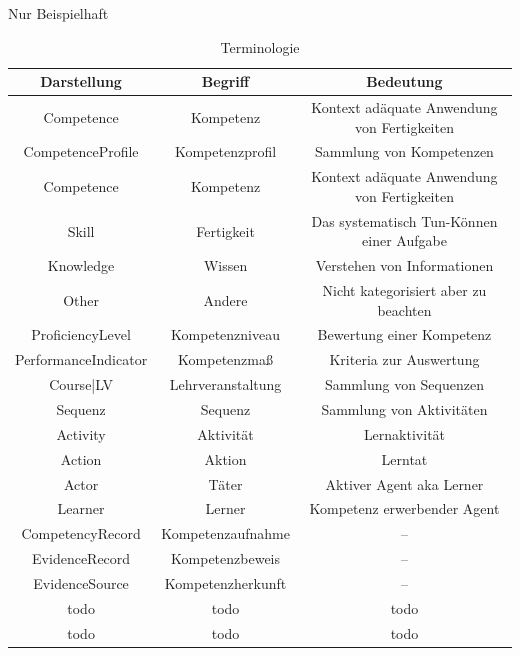 \documentclass[
12pt,
english,
ngerman,
headsepline,
twoside,
openright,
numbers=noenddot,version=first
]{scrreprt}
\providecommand{\tabularnewline}{\\}
\begin{document}
Nur Beispielhaft
\begin{table}[H]
	\caption{Terminologie}
	
	
	\noindent \centering{}\begin{tabular}{ccc}
		\hline 
		\noalign{\vskip\doublerulesep}
		Darstellung & Begriff & Bedeutung\tabularnewline[\doublerulesep]
		\hline
		\noalign{\vskip\doublerulesep}
		Competence & Kompetenz & Kontext adäquate Anwendung von Fertigkeiten \tabularnewline[\doublerulesep]
		\noalign{\vskip\doublerulesep}
		CompetenceProfile & Kompetenzprofil & Sammlung von Kompetenzen \tabularnewline[\doublerulesep]
		\noalign{\vskip\doublerulesep}
		Competence & Kompetenz & Kontext adäquate Anwendung von Fertigkeiten \tabularnewline[\doublerulesep]
		\noalign{\vskip\doublerulesep}
		Skill & Fertigkeit & Das systematisch Tun-Können einer Aufgabe \tabularnewline[\doublerulesep]
		\noalign{\vskip\doublerulesep}
		Knowledge & Wissen & Verstehen von Informationen
		\tabularnewline[\doublerulesep]
		\noalign{\vskip\doublerulesep}
		Other & Andere & Nicht kategorisiert aber zu beachten
		\tabularnewline[\doublerulesep]
		\noalign{\vskip\doublerulesep}
		ProficiencyLevel & Kompetenzniveau & Bewertung einer Kompetenz
		\tabularnewline[\doublerulesep]
		\noalign{\vskip\doublerulesep}
		PerformanceIndicator & Kompetenzmaß & Kriteria zur Auswertung
		\tabularnewline[\doublerulesep]
		\noalign{\vskip\doublerulesep}
		Course|LV & Lehrveranstaltung & Sammlung von Sequenzen
		\tabularnewline[\doublerulesep]
		\noalign{\vskip\doublerulesep}
		Sequenz & Sequenz & Sammlung von Aktivitäten
		\tabularnewline[\doublerulesep]
		\noalign{\vskip\doublerulesep}
		Activity & Aktivität & Lernaktivität
		\tabularnewline[\doublerulesep]
		\noalign{\vskip\doublerulesep}
		Action & Aktion & Lerntat
		\tabularnewline[\doublerulesep]
		\noalign{\vskip\doublerulesep}
		Actor & Täter & Aktiver Agent aka Lerner
		\tabularnewline[\doublerulesep]
		\noalign{\vskip\doublerulesep}
		Learner & Lerner & Kompetenz erwerbender Agent
		\tabularnewline[\doublerulesep]
		\noalign{\vskip\doublerulesep}
		CompetencyRecord & Kompetenzaufnahme & --
		\tabularnewline[\doublerulesep]
		\noalign{\vskip\doublerulesep}
		EvidenceRecord & Kompetenzbeweis & --
		\tabularnewline[\doublerulesep]
		\noalign{\vskip\doublerulesep}
		EvidenceSource & Kompetenzherkunft & --
		\tabularnewline[\doublerulesep]
		\noalign{\vskip\doublerulesep}
		todo & todo & todo
		\tabularnewline[\doublerulesep]
		\noalign{\vskip\doublerulesep}
		todo & todo & todo
		\tabularnewline[\doublerulesep]
		\hline
	\end{tabular}
\end{table}
\end{document}
